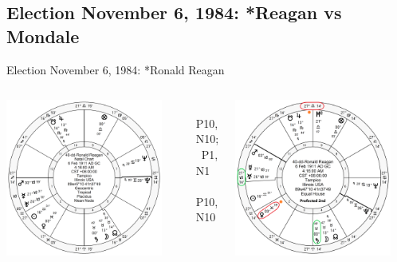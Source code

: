\subsection{Election November 6, 1984: *Reagan vs Mondale}
\begin{frame}[t]{Election November 6, 1984: *Ronald Reagan}
\small

\begin{columns}[T, onlytextwidth]
\vspace{-1em}
{\includegraphics[width=0.9\textwidth]{charts/Reagan-dd.png}}
\fontsize{8pt}{9pt}\selectfont

\Saturn\, \Opposition\, P10, N10; \Square\, P1, N1 \\
\Venus\, \Trine\, P10, N10


\vspace{-1em}
{\includegraphics[width=0.9\textwidth]{charts/Reagan-dd-Prof-2nd.png}}
\fontsize{8pt}{9pt}\selectfont


\end{columns}
\end{frame}
